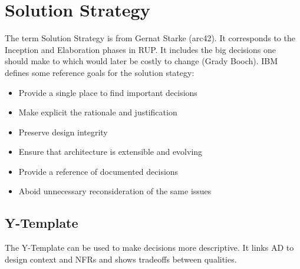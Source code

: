 \documentclass[../Main.tex]{subfiles}
\begin{document}
\section{Solution Strategy}
The term Solution Strategy is from Gernat Starke (arc42).
It corresponds to the Inception and Elaboration phases in
RUP. It includes the big decisions
one should make to which would later be costly to change (Grady Booch).
IBM defines some reference goals for the solution stategy:
\begin{itemize}
    \item Provide a single place to find important decisions
    \item Make explicit the rationale and justification
    \item Preserve design integrity
    \item Ensure that architecture is extensible and evolving
    \item Provide a reference of documented decisions
    \item Aboid unnecessary reconsideration of the same issues
\end{itemize}


\subsection{Y-Template}
The Y-Template can be used to make decisions more
descriptive. It links AD to design context and NFRs
and shows tradeoffs between qualities.
\end{document}
